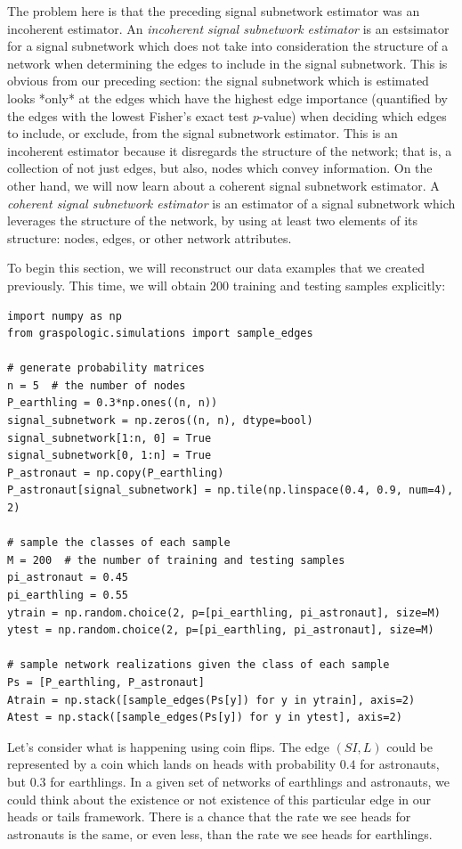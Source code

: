 The problem here is that the preceding signal subnetwork estimator was an incoherent estimator. An \textit{incoherent signal subnetwork estimator} is an estsimator for a signal subnetwork which does not take into consideration the structure of a network when determining the edges to include in the signal subnetwork. This is obvious from our preceding section: the signal subnetwork which is estimated looks *only* at the edges which have the highest edge importance (quantified by the edges with the lowest Fisher's exact test $p$-value) when deciding which edges to include, or exclude, from the signal subnetwork estimator. This is an incoherent estimator because it disregards the structure of the network; that is, a collection of not just edges, but also, nodes which convey information. On the other hand, we will now learn about a coherent signal subnetwork estimator. A \textit{coherent signal subnetwork estimator} is an estimator of a signal subnetwork which leverages the structure of the network, by using at least two elements of its structure: nodes, edges, or other network attributes.

To begin this section, we will reconstruct our data examples that we created previously. This time, we will obtain $200$ training and testing samples explicitly:

\begin{lstlisting}
import numpy as np
from graspologic.simulations import sample_edges

# generate probability matrices
n = 5  # the number of nodes
P_earthling = 0.3*np.ones((n, n))
signal_subnetwork = np.zeros((n, n), dtype=bool)
signal_subnetwork[1:n, 0] = True
signal_subnetwork[0, 1:n] = True
P_astronaut = np.copy(P_earthling)
P_astronaut[signal_subnetwork] = np.tile(np.linspace(0.4, 0.9, num=4), 2)

# sample the classes of each sample
M = 200  # the number of training and testing samples
pi_astronaut = 0.45
pi_earthling = 0.55
ytrain = np.random.choice(2, p=[pi_earthling, pi_astronaut], size=M)
ytest = np.random.choice(2, p=[pi_earthling, pi_astronaut], size=M)

# sample network realizations given the class of each sample
Ps = [P_earthling, P_astronaut]
Atrain = np.stack([sample_edges(Ps[y]) for y in ytrain], axis=2)
Atest = np.stack([sample_edges(Ps[y]) for y in ytest], axis=2)
\end{lstlisting}

Let's consider what is happening using coin flips. The edge $(SI, L)$ could be represented by a coin which lands on heads with probability $0.4$ for astronauts, but $0.3$ for earthlings. In a given set of networks of earthlings and astronauts, we could think about the existence or not existence of this particular edge in our heads or tails framework. There is a chance that the rate we see heads for astronauts is the same, or even less, than the rate we see heads for earthlings. 

